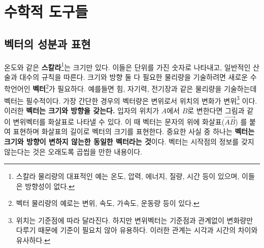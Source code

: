 
\pagestyle{hangul}
\chapter{수학적 도구들}\label{chap:math in physics}
\paragraphfootnotes

\section{벡터의 성분과 표현}\label{sec:appsec}
\begin{flushleft}
온도와 같은 \textbf{스칼라}\footnote{스칼라 물리량의 대표적인 예는 온도, 압력, 에너지, 질량, 시간 등이 있으며, 
이들은 방향성이 없다.}는 크기만 있다. 이들은 단위를 가진 숫자로 나타내고, 일반적인 산술과 대수의 규칙을 따른다.
크기와 방향 둘 다 필요한 물리량을 기술하려면 새로운 수학언어인 \textbf{벡터}\footnote{벡터 물리량의 예로는 변위, 
속도, 가속도, 운동량 등이 있다.}가 필요하다. 예를들면 힘, 자기력, 전기장과 같은 물리량을 기술하는데 벡터는 필수적이다. 
가장 간단한 경우의 벡터량은 변위로서 위치의 변화가 변위\footnote{위치는 기준점에 따라 달라진다. 
하지만 변위벡터는 기준점과 관계없이 변화량만 다루기 때문에 기준이 필요치 않아 유용하다. 이러한 관계는 시각과 시간의 차이와 유사하다.}
이다. 이러한 \textbf{벡터는 크기와 방향을 갖는다.}
입자의 위치가 $A$에서 $B$로 변한다면 그림과 같이 변위벡터를
화살표로 나타낼 수 있다. 이 때 벡터는 문자의 위에 화살표($\vec{AB}$) 를 붙여 표현하며 화살표의 길이로 벡터의 크기를 표현한다.
중요한 사실 중 하나는 \textbf{벡터는 크기와 방향이 변하지 않는한 동일한 벡터라는 것}이다. 
벡터는 시작점의 정보를 갖지 않는다는 것은 오래도록 곱씹을 만한 내용이다.  


\end{flushleft}
